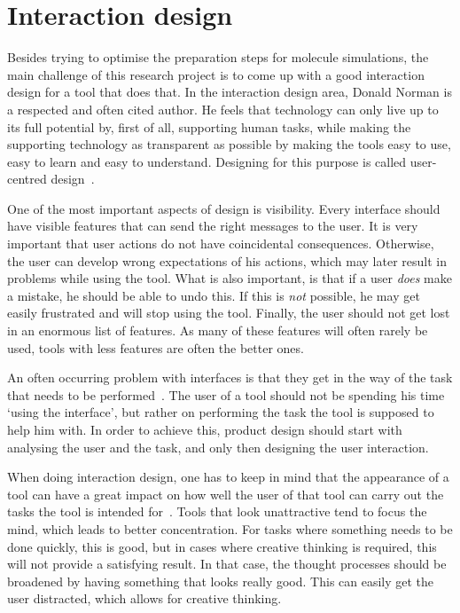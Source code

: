 \section{Interaction design}
Besides trying to optimise the preparation steps for molecule simulations, the main challenge of this research project is to come up with a good interaction design for a tool that does that. In the interaction design area, Donald Norman is a respected and often cited author. He feels that technology can only live up to its full potential by, first of all, supporting human tasks, while making the supporting technology as transparent as possible by making the tools easy to use, easy to learn and easy to understand. Designing for this purpose is called user-centred design~\cite{norman2002design}.

One of the most important aspects of design is visibility. Every interface should have visible features that can send the right messages to the user. It is very important that user actions do not have coincidental consequences. Otherwise, the user can develop wrong expectations of his actions, which may later result in problems while using the tool. What is also important, is that if a user \emph{does} make a mistake, he should be able to undo this. If this is \emph{not} possible, he may get easily frustrated and will stop using the tool. Finally, the user should not get lost in an enormous list of features. As many of these features will often rarely be used, tools with less features are often the better ones.

An often occurring problem with interfaces is that they get in the way of the task that needs to be performed~\cite{norman1990interfaces}. The user of a tool should not be spending his time `using the interface', but rather on performing the task the tool is supposed to help him with. In order to achieve this, product design should start with analysing the user and the task, and only then designing the user interaction.

When doing interaction design, one has to keep in mind that the appearance of a tool can have a great impact on how well the user of that tool can carry out the tasks the tool is intended for~\cite{norman2002emotion}. Tools that look unattractive tend to focus the mind, which leads to better concentration. For tasks where something needs to be done quickly, this is good, but in cases where creative thinking is required, this will not provide a satisfying result. In that case, the thought processes should be broadened by having something that looks really good. This can easily get the user distracted, which allows for creative thinking.

